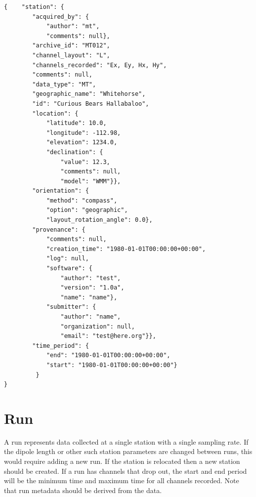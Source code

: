 \documentclass[12pt]{article}
\begin{document}
\begin{verbatim}
{    "station": {
        "acquired_by": {
            "author": "mt",
            "comments": null},
        "archive_id": "MT012",
        "channel_layout": "L",
        "channels_recorded": "Ex, Ey, Hx, Hy",
        "comments": null,
        "data_type": "MT",
        "geographic_name": "Whitehorse",
        "id": "Curious Bears Hallabaloo",
        "location": {
            "latitude": 10.0,
            "longitude": -112.98,
            "elevation": 1234.0,
            "declination": {
                "value": 12.3,
                "comments": null,
                "model": "WMM"}},
        "orientation": {
            "method": "compass",
            "option": "geographic",
            "layout_rotation_angle": 0.0},
        "provenance": {
            "comments": null,
            "creation_time": "1980-01-01T00:00:00+00:00",
            "log": null,
            "software": {
                "author": "test",
                "version": "1.0a",
                "name": "name"},
            "submitter": {
                "author": "name",
                "organization": null,
                "email": "test@here.org"}},
        "time_period": {
            "end": "1980-01-01T00:00:00+00:00",
            "start": "1980-01-01T00:00:00+00:00"}
         }
}
\end{verbatim}

\newpage
\section{Run}

A run represents data collected at a single station with a single sampling rate. If the dipole length or other such station parameters are changed between runs, this would require adding a new run.  If the station is relocated then a new station should be created.  If a run has channels that drop out, the start and end period will be the minimum time and maximum time for all channels recorded. Note that run metadata should be derived from the data.  
\end{document}
